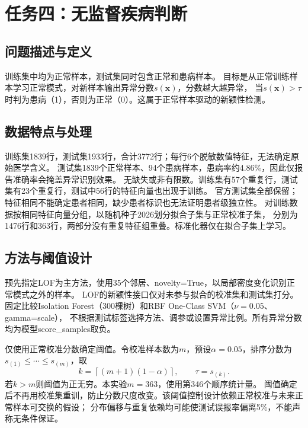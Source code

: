 \section{任务四：无监督疾病判断}
\subsection{问题描述与定义}
训练集中均为正常样本，测试集同时包含正常和患病样本。
目标是从正常训练样本学习正常模式，对新样本输出异常分数$s(\mathbf x)$，分数越大越异常，
当$s(\mathbf x)>\tau$时判为患病（1），否则为正常（0）。这属于正常样本驱动的新颖性检测。

\subsection{数据特点与处理}
训练集1839行，测试集1933行，合计3772行；每行6个脱敏数值特征，无法确定原始医学含义。
测试集1839个正常样本、94个患病样本，患病率约4.86\%，因此仅报告准确率会掩盖异常识别效果。
无缺失或非有限数。训练集有57个重复行，测试集有23个重复行，测试中56行的特征向量也出现于训练。
官方测试集全部保留；特征相同不能确定患者相同，缺少患者标识也无法证明患者级独立性。
对训练数据按相同特征向量分组，以随机种子2026划分拟合子集与正常校准子集，
分别为1476行和363行，两部分没有重复特征组重叠。标准化器仅在拟合子集上学习。

\subsection{方法与阈值设计}
预先指定LOF为主方法，使用35个邻居、novelty=True，以局部密度变化识别正常模式之外的样本。
LOF的新颖性接口仅对未参与拟合的校准集和测试集打分。
固定比较Isolation Forest（300棵树）和RBF One-Class SVM（$\nu=0.05$、gamma=scale），
不根据测试标签选择方法、调参或设置异常比例。所有异常分数均为模型score\_samples取负。

仅使用正常校准分数确定阈值。令校准样本数为$m$，预设$\alpha=0.05$，排序分数为$s_{(1)}\le\cdots\le s_{(m)}$，取
\begin{equation}
 k=\left\lceil(m+1)(1-\alpha)\right\rceil,\qquad\tau=s_{(k)}.
\end{equation}
若$k>m$则阈值为正无穷。本实验$m=363$，使用第346个顺序统计量。
阈值确定后不再用校准集重训，防止分数尺度改变。该阈值控制设计依赖正常校准与未来正常样本可交换的假设；
分布偏移与重复依赖均可能使测试误报率偏离5\%，不能声称无条件保证。

